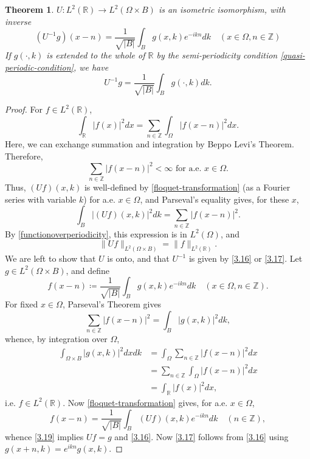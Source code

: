 \documentclass[fontsize=14pt,a4paper,DIV=1]{scrartcl}
\newtheorem{theorem}{Theorem}[section]
\numberwithin{equation}{section}
\newcommand{\R}{\mathbb{R}}
\newcommand{\Z}{\mathbb{Z}}
\begin{document}
\begin{theorem} \label{3.4.1}
	$ U \colon L^{2}(\R) \rightarrow L^{2}(\Omega \times B)$ is an isometric isomorphism, with inverse
		\begin{equation}
			(U^{-1}g)(x - n) = \frac{1}{\sqrt{|B|}} \int_{B} g(x, k) e^{-ikn} dk \quad (x \in \Omega, n \in \Z) \label{3.16}
		\end{equation} 
	If $g(\cdot, k)$ is extended to the whole of $\R$ by the semi-periodicity condition \eqref{quasi-periodic-condition}, we have
		\begin{equation}
			U^{-1} g = \frac{1}{\sqrt{|B|}} \int_{B} g(\cdot, k) dk. \label{3.17}
		\end{equation}
\end{theorem}
\begin{proof}
	For $f \in L^{2}(\R)$,
		\begin{equation}
			\int_{\R} |f(x)|^{2} dx = \sum_{n \in \Z} \int_{\Omega} |f(x - n)|^{2} dx. \label{functionoverperiodicity}
		\end{equation} 
	Here, we can exchange summation and integration by Beppo Levi's Theorem. Therefore, 
		\[ \sum_{n \in \Z} |f(x - n)|^{2} < \infty \text{ for a.e. } x \in \Omega.\]
	Thus, $(Uf)(x, k)$ is well-defined by \eqref{floquet-transformation} (as a Fourier series with variable $k$) for a.e. $x \in \Omega$, and Parseval's equality gives, for these $x$,
		\[ \int_{B}|(Uf)(x,k)|^{2} dk = \sum_{n \in \Z} |f(x - n)|^{2}. \]
	By \eqref{functionoverperiodicity}, this expression is in $L^{2}(\Omega)$, and
		\[ \| Uf \|_{L^{2}(\Omega \times B)} = \|f\|_{L^{2}(\R)}. \]
	We are left to show that $U$ is onto, and that $U^{-1}$ is given by \eqref{3.16} or \eqref{3.17}. Let $g \in L^{2}(\Omega \times B)$, and define
		\begin{equation}
			f(x - n) \coloneqq \frac{1}{\sqrt{|B|}} \int_{B} g(x, k) e^{-ikn} dk \quad (x \in \Omega, n \in\Z).\label{3.19}
		\end{equation}
	For fixed $x \in \Omega$, Parseval's Theorem gives
		\[ \sum_{n \in \Z} |f(x - n)|^{2} = \int_{B} |g(x, k)|^{2} dk, \]
	whence, by integration over $\Omega$,
		\begin{eqnarray}
			\int_{\Omega \times B} |g(x, k)|^{2} dx dk & = \int_{\Omega} \sum_{n \in \Z} |f(x - n)|^{2} dx \\
				& = \sum_{n \in\Z} \int_{\Omega} |f(x-n)|^{2} dx \\
				& = \int_{\R} |f(x)|^{2} dx,	
		\end{eqnarray}
	i.e. $f \in L^{2}(\R)$. Now \eqref{floquet-transformation} gives, for a.e. $x \in\Omega$,
		\[ f(x - n) = \frac{1}{\sqrt{|B|}} \int_{B} (Uf)(x,k) e^{-ikn} dk \quad (n \in \Z), \]
	whence \eqref{3.19} implies $U f = g$ and \eqref{3.16}. Now \eqref{3.17} follows from \eqref{3.16} using $g(x + n, k) = e^{ikn} g(x, k)$.
\end{proof}
	
\end{document}
